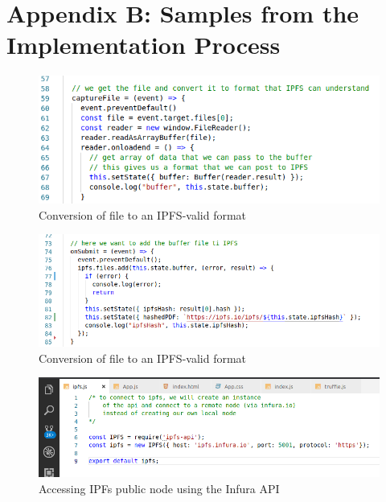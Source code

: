 \section{Appendix B: Samples from the Implementation Process}

\begin{figure}[H]
\center
\includegraphics[scale=0.8]{images/codeconvert.png}
\caption{Conversion of file to an IPFS-valid format}
\end{figure}

\begin{figure}[H]
\includegraphics[scale=0.8]{images/codesubmit.png}
\caption{Conversion of file to an IPFS-valid format}
\end{figure}

\begin{figure}[H]
\includegraphics[scale=0.5]{images/codeinfura.png}
\caption{Accessing IPFs public node using the Infura API}
\end{figure}

